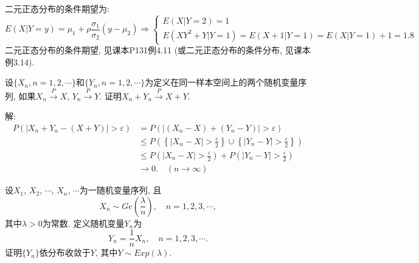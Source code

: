 \documentclass[standard]{ExBook}
\renewenvironment{shaded}{%
  \def\FrameCommand{\fboxsep=\FrameSep \colorbox{shadecolor}}%
  \MakeFramed{\advance\hsize-\width \FrameRestore}%
}{%
  \endMakeFramed
}
\begin{document}
\begin{qitems}
二元正态分布的条件期望为:
$$
\displaystyle E(X|Y=y)=\mu_1+\rho\frac{\sigma_1}{\sigma_2}(y-\mu_2) \Longrightarrow
\left\{
\begin{array}{l}
E(X|Y=2)=1\\
E(XY^2+Y|Y=1)=E(X+1|Y=1)=E(X|Y=1)+1=1.8
\end{array}
\right.
$$
\textcolor{themeColor}{\selectfont {} 二元正态分布的条件期望, 见课本P131例4.11 (或二元正态分布的条件分布, 见课本例3.14).}

\vspace{2.5cm-5em}

    \begin{bbox}
    \begin{shaded}
        \qitem
设$\{X_n,n=1,2,\cdots\}$和$\{Y_n,n=1,2,\cdots\}$为定义在同一样本空间上的两个随机变量序列, 如果$X_n\xrightarrow{P}X$, $Y_n\xrightarrow{P}Y$. 证明$X_n+Y_n\xrightarrow{P}X+Y$.
    \end{shaded}
    \end{bbox}

\vspace{\dimexpr2.5cm-5em\relax}

解: 
\begin{align*}
P \left( \left| X_n + Y_n - (X + Y) \right| > \varepsilon \right) 
&= P \left( \left| (X_n - X) + (Y_n - Y) \right| > \varepsilon \right) \\
&\le P \left( \left\{ \left| X_n - X \right| > \frac{\varepsilon}{2} \right\} \cup \left\{ \left| Y_n - Y \right| > \frac{\varepsilon}{2} \right\} \right) \\
&\le P \left( \left| X_n - X \right| > \frac{\varepsilon}{2} \right) + P \left( \left| Y_n - Y \right| > \frac{\varepsilon}{2} \right) \\
&\to 0. \quad (n\to\infty)
\end{align*}

\vspace{2.5cm-5em}

    \begin{bbox}
    \begin{shaded}
        \qitem
设$X_1$, $X_2$, $\cdots$, $X_n$, $\cdots$为一随机变量序列, 且
$$X_n\sim Ge\left(\frac{\lambda}{n}\right),\quad n=1,2,3,\cdots,$$
其中$\lambda>0$为常数. 定义随机变量$Y_n$为
$$Y_n=\frac{1}{n}X_n,\quad n=1,2,3,\cdots.$$
证明$\{Y_n\}$依分布收敛于$Y$, 其中$Y\sim Exp(\lambda)$.
    \end{shaded}
    \end{bbox}

\vspace{\dimexpr2.5cm-5em\relax}


\end{qitems}
\end{document}
